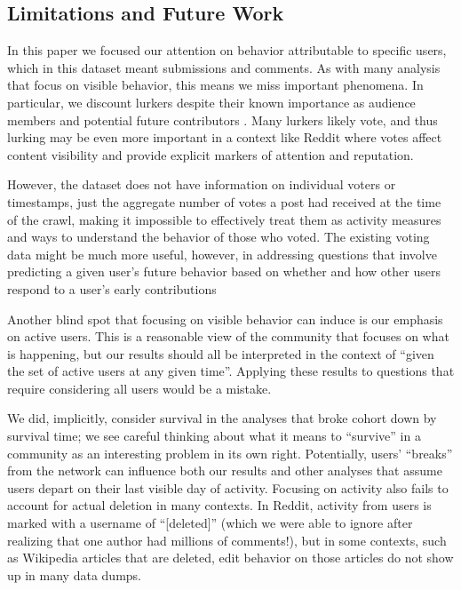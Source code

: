 \subsection{Limitations and Future Work}

In this paper we focused our attention on behavior attributable to specific users, which in this dataset meant submissions and comments.  As with many analysis that focus on visible behavior, this means we miss important phenomena.  In particular, we discount lurkers despite their known importance as audience members \cite{Nonnecke2003} and potential future contributors \cite{Ridings2006}.  Many lurkers likely vote, and thus lurking may be even more important in a context like Reddit where votes affect content visibility and provide explicit markers of attention and reputation.  

However, the dataset does not have information on individual voters or timestamps, just the aggregate number of votes a post had received at the time of the crawl, making it impossible to effectively treat them as activity measures and ways to understand the behavior of those who voted.  The existing voting data might be much more useful, however, in addressing questions that involve predicting a given user's future behavior based on whether and how other users respond to a user's early contributions \cite{Joyce2006,Sarkar2012}

Another blind spot that focusing on visible behavior can induce is our emphasis on active users.  This is a reasonable view of the community that focuses on what is happening, but our results should all be interpreted in the context of ``given the set of active users at any given time''.  Applying these results to questions that require considering all users would be a mistake.  

We did, implicitly, consider survival in the analyses that broke cohort down by survival time; we see careful thinking about what it means to ``survive'' in a community as an interesting problem in its own right.  Potentially, users' ``breaks'' from the network can influence both our results and other analyses that assume users depart on their last visible day of activity. 
Focusing on activity also fails to account for actual deletion in many contexts.  In Reddit, activity from users is marked with a username of ``[deleted]'' (which we were able to ignore after realizing that one author had millions of comments!), but in some contexts, such as Wikipedia articles that are deleted, edit behavior on those articles do not show up in many data dumps.

